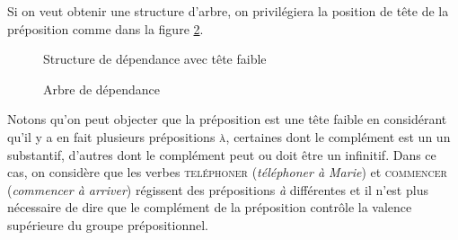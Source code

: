 Si on veut obtenir une structure d'arbre, on privilégiera la position de tête de la préposition comme dans la figure \ref{fig:teteprep}.




\begin{figure}[H]
\caption{Structure de dépendance avec tête faible\label{fig:tetefaible}}
\end{figure}

\begin{figure}[H]
\caption{Arbre de dépendance\label{fig:teteprep}}
\end{figure}

Notons qu'on peut objecter que la préposition est une tête faible en considérant qu'il y a en fait  plusieurs prépositions \textsc{à}, certaines dont le complément est un un substantif, d'autres dont le complément peut ou doit être un infinitif. Dans ce cas, on considère que les verbes \textsc{teléphoner} (\textit{téléphoner à Marie}) et \textsc{commencer} (\textit{commencer à arriver}) régissent des prépositions \textit{à} différentes et il n’est plus nécessaire de dire que le complément de la préposition contrôle la valence supérieure du groupe prépositionnel.


